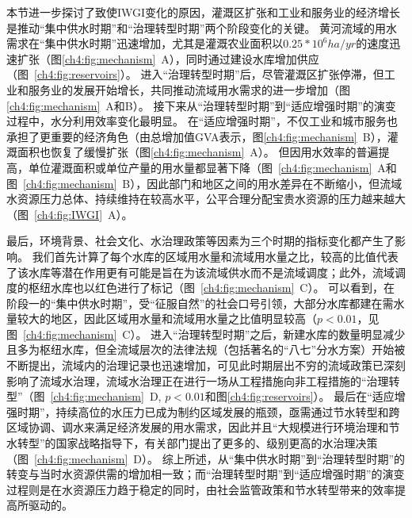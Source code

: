 本节进一步探讨了致使IWGI变化的原因，灌溉区扩张和工业和服务业的经济增长是推动“集中供水时期”和“治理转型时期”两个阶段变化的关键。
黄河流域的用水需求在“集中供水时期”迅速增加，尤其是灌溉农业面积以$0.25*10^6 ha/yr$的速度迅速扩张（图\ref{ch4:fig:mechanism}~A），同时通过建设水库增加供应（图~\ref{ch4:fig:reservoirs}）。
进入“治理转型时期”后，尽管灌溉区扩张停滞，但工业和服务业的发展开始增长，共同推动流域用水需求的进一步增加（图\ref{ch4:fig:mechanism}~A和B）。
接下来从“治理转型时期”到“适应增强时期”的演变过程中，水分利用效率变化最明显。
在“适应增强时期”，不仅工业和城市服务也承担了更重要的经济角色（由总增加值GVA表示，图\ref{ch4:fig:mechanism}~B），灌溉面积也恢复了缓慢扩张（图\ref{ch4:fig:mechanism}~A）。
但因用水效率的普遍提高，单位灌溉面积或单位产量的用水量都显著下降（图~\ref{ch4:fig:mechanism}~A和图~\ref{ch4:fig:mechanism}~B），因此部门和地区之间的用水差异在不断缩小，但流域水资源压力总体、持续维持在较高水平，公平合理分配宝贵水资源的压力越来越大（图~\ref{ch4:fig:IWGI}~A）。

最后，环境背景、社会文化、水治理政策等因素为三个时期的指标变化都产生了影响。
我们首先计算了每个水库的区域用水量和流域用水量之比，较高的比值代表了该水库等潜在作用更有可能是旨在为该流域供水而不是流域调度；此外，流域调度的枢纽水库也以红色进行了标记（图~\ref{ch4:fig:mechanism}~C）。
可以看到，在阶段一的“集中供水时期”，受“征服自然”的社会口号引领，大部分水库都建在需水量较大的地区，因此区域用水量和流域用水量之比值明显较高（$p<0.01$，见图~\ref{ch4:fig:mechanism}~C）。
进入“治理转型时期”之后，新建水库的数量明显减少且多为枢纽水库，但全流域层次的法律法规（包括著名的“八七”分水方案）开始被不断提出，流域内的治理记录也迅速增加，可见此时期层出不穷的流域政策已深刻影响了流域水治理，流域水治理正在进行一场从工程措施向非工程措施的“治理转型”（图~\ref{ch4:fig:mechanism}~D, $p<0.01$和图\ref{ch4:fig:reservoirs}）。
最后在“适应增强时期”，持续高位的水压力已成为制约区域发展的瓶颈，亟需通过节水转型和跨区域协调、调水来满足经济发展的用水需求，因此并且“大规模进行环境治理和节水转型”的国家战略指导下，有关部门提出了更多的、级别更高的水治理决策（图~\ref{ch4:fig:mechanism}~D）。
综上所述，从“集中供水时期”到“治理转型时期”的转变与当时水资源供需的增加相一致；而“治理转型时期”到“适应增强时期”的演变过程则是在水资源压力趋于稳定的同时，由社会监管政策和节水转型带来的效率提高所驱动的。